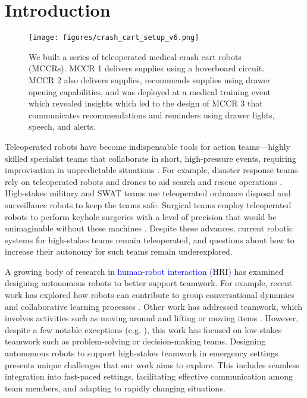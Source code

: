 

\section{Introduction}
 


\begin{figure}[t]
    \centering
 \texttt{[image: figures/crash\_cart\_setup\_v6.png]}
    \caption{We built a series of teleoperated medical crash cart robots (MCCRs). MCCR 1 delivers supplies using a hoverboard circuit. MCCR 2 also delivers supplies, recommends supplies using drawer opening capabilities, and was deployed at a medical training event which revealed insights which led to the design of MCCR 3 that communicates recommendations and reminders using drawer lights, speech, and alerts.}
    \label{fig:cart_cart_field_studies}
\end{figure}



Teleoperated robots have become indispensable tools for action teams---highly skilled specialist teams that collaborate in short, high-pressure events, requiring improvisation in unpredictable situations \cite{sundstrom1990work}. 
For example, disaster response teams rely on teleoperated robots and drones to aid search and rescue operations \cite{casper2003human, murphy2017disaster}. 
High-stakes military and SWAT teams use teleoperated ordnance disposal \cite{carpenter2016culture} and surveillance robots \cite{jones2002autonomous} to keep the teams safe. 
Surgical teams employ teleoperated robots to perform keyhole surgeries with a level of precision that would be unimaginable without these machines \cite{cheatle2019sensing, beane2019shadow}. 
Despite these advances, current robotic systems for high-stakes teams remain teleoperated, and questions about how to increase their autonomy for such teams remain underexplored.


A growing body of research in \textcolor{blue}{human-robot interaction {(}}HRI\textcolor{blue}{)} has examined designing autonomous robots to better support teamwork. 
For example, recent work has explored how robots can contribute to group conversational dynamics and collaborative learning processes \cite{tennent2019micbot,alves2019empathic}. 
Other work has addressed teamwork, which involves activities such as moving around and lifting or moving items \cite{fourie2022joint}. 
However, despite a few notable exceptions (e.g. \cite{bethel2012discoveries, jones2002extreme}), this work has focused on low-stakes teamwork such as problem-solving or decision-making teams. 
Designing autonomous robots to support high-stakes teamwork in emergency settings presents unique challenges that our work aims to explore. 
This includes seamless integration into fast-paced settings, facilitating effective communication among team members, and adapting to rapidly changing situations.

